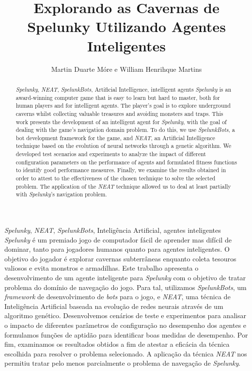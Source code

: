 \documentclass[portuguese,oneside]{tcc}
\author{Martin Duarte Móre e William Henrihque Martins}
\title{Explorando as Cavernas de Spelunky Utilizando Agentes Inteligentes}
      {Exploring Spelunky's Caves Using Intelligent Agents}
\begin{document}



\begin{resumo}{\textit{Spelunky}, \textit{NEAT}, \textit{SpelunkBots},
	Inteligência Artificial, agentes inteligentes}
	\textit{Spelunky} é um premiado jogo de computador fácil de aprender mas
	difícil de dominar, tanto para jogadores humanos quanto para agentes
	inteligentes. O objetivo do jogador é explorar cavernas subterrâneas
	enquanto coleta tesouros valiosos e evita monstros e armadilhas. Este
	trabalho apresenta o desenvolvimento de um agente inteligente para
	\textit{Spelunky} com o objetivo de tratar problema do domínio de navegação
	do jogo.  Para tal, utilizamos \textit{SpelunkBots}, um \textit{framework}
	de desenvolvimento de \textit{bots} para o jogo, e \textit{NEAT}, uma
	técnica de Inteligência Artificial baseada na evolução de redes neurais
	através de um algoritmo genético.  Desenvolvemos cenários de teste e
	experimentos para analisar o impacto de diferentes parâmetros de
	configuração no desempenho dos agentes e formulamos funções de aptidão para
	identificar boas medidas de desempenho. Por fim, examinamos os resultados
	obtidos a fim de atestar a eficácia da técnica escolhida para resolver o
	problema selecionado. A aplicação da técnica \textit{NEAT} nos permitiu
	tratar pelo menos parcialmente o problema de navegação de \textit{Spelunky}.
\end{resumo}

\begin{abstract}{\textit{Spelunky}, \textit{NEAT}, \textit{SpelunkBots},
	Artificial Intelligence, intelligent agents}
	\textit{Spelunky} is an award-winning computer game that is easy to learn
	but hard to master, both for human players and for intelligent agents. The
	player's goal is to explore underground caverns whilst collecting valuable
	treasures and avoiding monsters and traps. This work presents the
	development of an intelligent agent for \textit{Spelunky}, with the goal of
	dealing with the game's navigation domain problem. To do this, we use
	\textit{SpelunkBots}, a bot development framework for the game, and
	\textit{NEAT}, an Artificial Intelligence technique based on the evolution
	of neural networks through a genetic algorithm. We developed test scenarios
	and experiments to analyze the impact of different configuration parameters
	on the performance of agents and formulated fitness functions to identify
	good performance measures. Finally, we examine the results obtained in order
	to attest to the effectiveness of the chosen technique to solve the selected
	problem. The application of the \textit{NEAT} technique allowed us to deal
	at least partially with \textit{Spelunky}'s navigation problem.
\end{abstract}
\end{document}
